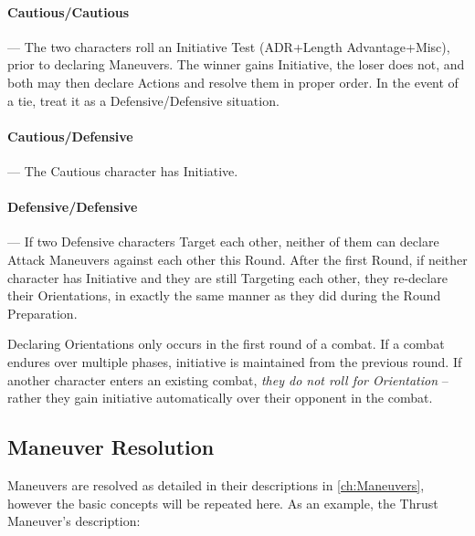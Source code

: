 \documentclass[oneside,11pt,english]{book}
\begin{document}
\paragraph{Cautious/Cautious}---\quad
The two characters roll an Initiative Test (ADR+Length Advantage+Misc), prior to declaring
Maneuvers. The winner gains Initiative, the loser does not, and both may then declare Actions
and resolve them in proper order. In the event of a tie, treat it as a Defensive/Defensive situation.
\paragraph{\label{par:Cautious/Defensive}Cautious/Defensive}---\quad
The Cautious character has Initiative.
\paragraph{\label{par:Defensive/Defensive}Defensive/Defensive}---\quad
If two Defensive characters Target each other, neither of them can declare Attack Maneuvers
against each other this Round. After the first Round, if neither character has Initiative and they
are still Targeting each other, they re-declare their Orientations, in exactly the same manner as
they did during the Round Preparation.

Declaring Orientations only occurs in the first round of a combat. If a combat endures over multiple
phases, initiative is maintained from the previous round. If another character enters an existing combat,
\emph{they do not roll for Orientation} -- rather they gain initiative automatically over their opponent in the
combat.

\subsection{Maneuver Resolution}
Maneuvers are resolved as detailed in their descriptions in \autoref{ch:Maneuvers}, however the basic concepts will
be repeated here.
As an example, the Thrust Maneuver’s description:
\end{document}
